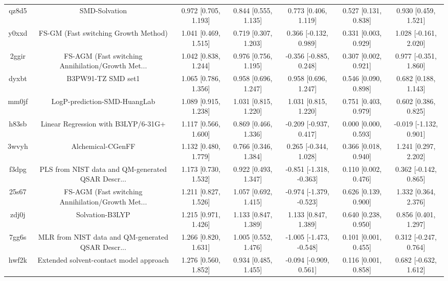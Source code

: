 \documentclass{article}
\begin{document}
\begin{center}
\begin{longtable}{|ccccccc|}
 qz8d5 &                                      SMD-Solvation &  0.972 [0.705, 1.193] &  0.844 [0.555, 1.135] &     0.773 [0.406, 1.119] &  0.527 [0.131, 0.838] &    0.930 [0.459, 1.521] \\
 y0xxd &               FS-GM (Fast switching Growth Method) &  1.041 [0.469, 1.515] &  0.719 [0.307, 1.203] &    0.366 [-0.132, 0.989] &  0.331 [0.003, 0.929] &   1.028 [-0.161, 2.020] \\
 2ggir &  FS-AGM (Fast switching Annihilation/Growth Met... &  1.042 [0.838, 1.244] &  0.976 [0.756, 1.195] &   -0.356 [-0.885, 0.248] &  0.307 [0.002, 0.921] &   0.977 [-0.351, 1.860] \\
 dyxbt &                                 B3PW91-TZ SMD set1 &  1.065 [0.786, 1.356] &  0.958 [0.696, 1.247] &     0.958 [0.696, 1.247] &  0.546 [0.090, 0.898] &    0.682 [0.188, 1.143] \\
 mm0jf &                       LogP-prediction-SMD-HuangLab &  1.089 [0.915, 1.238] &  1.031 [0.815, 1.220] &     1.031 [0.815, 1.220] &  0.751 [0.403, 0.979] &    0.602 [0.386, 0.825] \\
 h83sb &                Linear Regression with B3LYP/6-31G+ &  1.117 [0.566, 1.600] &  0.869 [0.466, 1.336] &   -0.209 [-0.937, 0.417] &  0.000 [0.000, 0.593] &  -0.019 [-1.132, 0.901] \\
 3wvyh &                                  Alchemical-CGenFF &  1.132 [0.480, 1.779] &  0.766 [0.346, 1.384] &    0.265 [-0.344, 1.028] &  0.366 [0.018, 0.940] &    1.241 [0.297, 2.202] \\
 f3dpg &  PLS from NIST data and QM-generated QSAR Descr... &  1.173 [0.730, 1.532] &  0.922 [0.493, 1.347] &  -0.851 [-1.318, -0.363] &  0.110 [0.002, 0.476] &   0.362 [-0.142, 0.865] \\
 25s67 &  FS-AGM (Fast switching Annihilation/Growth Met... &  1.211 [0.827, 1.526] &  1.057 [0.692, 1.415] &  -0.974 [-1.379, -0.523] &  0.626 [0.139, 0.900] &    1.332 [0.364, 2.376] \\
 zdj0j &                                    Solvation-B3LYP &  1.215 [0.971, 1.426] &  1.133 [0.847, 1.389] &     1.133 [0.847, 1.389] &  0.640 [0.238, 0.950] &    0.856 [0.401, 1.297] \\
 7gg6s &  MLR from NIST data and QM-generated QSAR Descr... &  1.266 [0.820, 1.631] &  1.005 [0.552, 1.476] &  -1.005 [-1.473, -0.548] &  0.101 [0.001, 0.455] &   0.312 [-0.247, 0.764] \\
 hwf2k &            Extended solvent-contact model approach &  1.276 [0.560, 1.852] &  0.934 [0.485, 1.455] &   -0.094 [-0.909, 0.561] &  0.116 [0.001, 0.858] &   0.682 [-0.632, 1.612] \\

\end{longtable}
\end{center}
\end{document}
